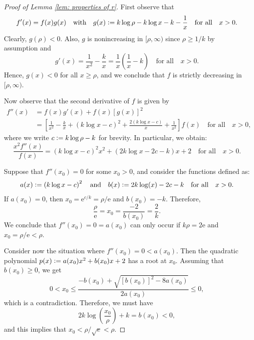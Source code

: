 \documentclass[10pt,a4paper]{amsart}
\newcommand{\defeq}{\vcentcolon=}
\newcommand{\e}{\mathrm{e}}
\begin{document}
\begin{proof}[Proof of Lemma \ref{lem: properties of r}]
	First observe that
	\begin{equation*}
		f'(x) = f(x)g(x) \quad \text{with} \quad g(x) \defeq k\log \rho - k \log x - k - \frac{1}{x} \quad \text{for all} \quad x > 0.
	\end{equation*}
	Clearly, $g(\rho) < 0$. Also, $g$ is nonincreasing in $[\rho, \infty)$ since $\rho \geq 1 / k$ by assumption and
	\begin{equation*}
		g'(x) = \frac{1}{x^2} - \frac{k}{x} = \frac{1}{x}\left(\frac{1}{x} - k\right) \quad \text{for all} \quad x > 0.
	\end{equation*}
	Hence, $g(x) < 0$ for all $x \geq \rho$, and we conclude that $f$ is strictly decreasing in $[\rho, \infty)$.
	
	Now observe that the second derivative of $f$ is given by
	\begin{align*}
		f''(x) &= f(x)g'(x) + f(x)\left[g(x)\right]^2 \\
		&= \left[\frac{1}{x^2} - \frac{k}{x} + \left(k\log x - c\right)^2 + \frac{2\left(k\log x - c\right)}{x} + \frac{1}{x^2}\right]f(x) \quad \text{for all} \quad x > 0,
	\end{align*} 
	where we write $c \defeq k\log \rho - k$ for brevity. In particular, we obtain:
	\begin{equation*}
		\frac{x^2f''(x)}{f(x)} = \left(k\log x - c\right)^2x^2 + \left(2k\log x - 2c - k\right)x + 2 \quad \text{for all} \quad x > 0.
	\end{equation*}
	
	Suppose that $f''(x_0) = 0$ for some $x_0 > 0$, and consider the functions defined as:
	\begin{equation*}
		a(x) \defeq \left(k\log x - c\right)^2 \quad \text{and} \quad b(x) \defeq 2k\log(x) - 2c - k \quad \text{for all} \quad x > 0.
	\end{equation*}
	If $a(x_0) = 0$, then $x_0 = \e^{c / k} = \rho / \e$ and $b(x_0) = -k$. Therefore,
	\begin{equation*}
		\frac{\rho}{\e} = x_0 = \frac{-2}{b(x_0)} = \frac{2}{k}.
	\end{equation*}
	We conclude that $f''(x_0) = 0 = a(x_0)$ can only occur if $k \rho = 2 \e$ and $x_0 = \rho / \e < \rho$.
	
	Consider now the situation where $f''(x_0) = 0 < a(x_0)$. Then the quadratic polynomial $p(x) \defeq a(x_0) x^2 + b(x_0)x + 2$ has a root at $x_0$.  Assuming that $b(x_0) \geq 0$, we get
	\begin{equation*}
		0 < x_0 \leq \frac{-b(x_0) + \sqrt{\left[b(x_0)\right]^2 - 8a(x_0)}}{2a(x_0)} \leq 0,
	\end{equation*}
	which is a contradiction. Therefore, we must have
	\begin{equation*}
		2k\log\left(\frac{x_0}{\rho}\right) + k = b(x_0) < 0,
	\end{equation*}
	and this implies that $x_0 < \rho / \sqrt{e} < \rho$.
	

\end{proof}
\end{document}
